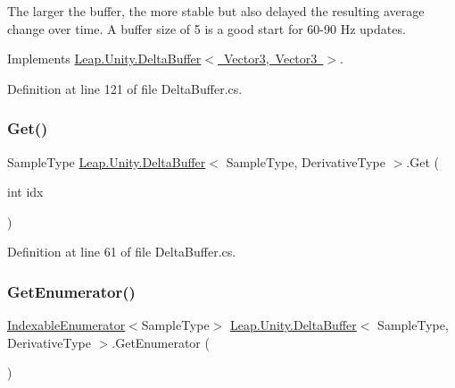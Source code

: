 The larger the buffer, the more stable but also delayed the resulting average change over time. A buffer size of 5 is a good start for 60-\/90 Hz updates. 

Implements \mbox{\hyperlink{class_leap_1_1_unity_1_1_delta_buffer_a8700bc7a1676ba39977f58debf74f5df}{Leap.\+Unity.\+Delta\+Buffer$<$ Vector3, Vector3 $>$}}.



Definition at line 121 of file Delta\+Buffer.\+cs.

\mbox{\label{class_leap_1_1_unity_1_1_delta_buffer_a1c44f3ee9a602076c7c1ae001e2289e5}} 
\subsubsection{\texorpdfstring{Get()}{Get()}}
{\footnotesize\ttfamily Sample\+Type \mbox{\hyperlink{class_leap_1_1_unity_1_1_delta_buffer}{Leap.\+Unity.\+Delta\+Buffer}}$<$ Sample\+Type, Derivative\+Type $>$.Get (\begin{DoxyParamCaption}\item[{int}]{idx }\end{DoxyParamCaption})}



Definition at line 61 of file Delta\+Buffer.\+cs.

\mbox{\label{class_leap_1_1_unity_1_1_delta_buffer_a12430bca3065eecc8084547cb8262f56}} 
\subsubsection{\texorpdfstring{GetEnumerator()}{GetEnumerator()}}
{\footnotesize\ttfamily \mbox{\hyperlink{struct_leap_1_1_unity_1_1_indexable_enumerator}{Indexable\+Enumerator}}$<$Sample\+Type$>$ \mbox{\hyperlink{class_leap_1_1_unity_1_1_delta_buffer}{Leap.\+Unity.\+Delta\+Buffer}}$<$ Sample\+Type, Derivative\+Type $>$.Get\+Enumerator (\begin{DoxyParamCaption}{ }\end{DoxyParamCaption})}



